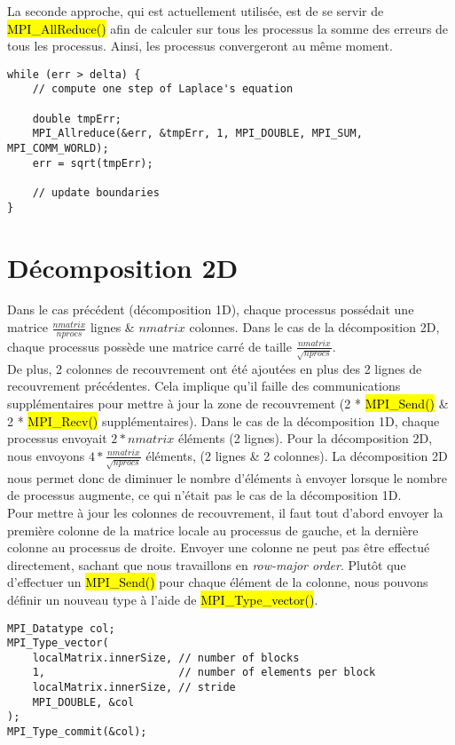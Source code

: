 \documentclass[a4paper,table]{article}
\begin{document}
La seconde approche, qui est actuellement utilisée, est de se servir de
\hl{MPI\_AllReduce()} afin de calculer sur tous les processus la somme des
erreurs de tous les processus. Ainsi, les processus convergeront au même
moment.

\begin{lstlisting}
while (err > delta) {
	// compute one step of Laplace's equation
	
    double tmpErr;
    MPI_Allreduce(&err, &tmpErr, 1, MPI_DOUBLE, MPI_SUM, MPI_COMM_WORLD);
    err = sqrt(tmpErr);
	
	// update boundaries
}
\end{lstlisting}

\section{Décomposition 2D}

Dans le cas précédent (décomposition 1D), chaque processus possédait une matrice
$\frac{nmatrix}{nprocs}$ lignes \& $nmatrix$ colonnes. Dans le cas de la
décomposition 2D, chaque processus possède une matrice carré de taille
$\frac{nmatrix}{\sqrt{nprocs}}$.\\

De plus, 2 colonnes de recouvrement ont été ajoutées en plus des 2 lignes de
recouvrement précédentes. Cela implique qu'il faille des communications
supplémentaires pour mettre à jour la zone de recouvrement (2 * \hl{MPI\_Send()}
\& 2 * \hl{MPI\_Recv()} supplémentaires). Dans le cas de la décomposition 1D,
chaque processus envoyait $2 * nmatrix$ éléments (2 lignes). Pour la
décomposition 2D, nous envoyons $4 * \frac{nmatrix}{\sqrt{nprocs}}$ éléments,
(2 lignes \& 2 colonnes). La décomposition 2D nous permet donc de diminuer le
nombre d'éléments à envoyer lorsque le nombre de processus augmente, ce qui
n'était pas le cas de la décomposition 1D.\\

Pour mettre à jour les colonnes de recouvrement, il faut tout d'abord envoyer
la première colonne de la matrice locale au processus de gauche, et la dernière
colonne au processus de droite. Envoyer une colonne ne peut pas être effectué
directement, sachant que nous travaillons en \emph{row-major order}. Plutôt que
d'effectuer un \hl{MPI\_Send()} pour chaque élément de la colonne, nous pouvons
définir un nouveau type à l'aide de \hl{MPI\_Type\_vector()}.\\
\newpage

\begin{lstlisting}
MPI_Datatype col;
MPI_Type_vector(
    localMatrix.innerSize, // number of blocks
    1,                     // number of elements per block
    localMatrix.innerSize, // stride
    MPI_DOUBLE, &col
);
MPI_Type_commit(&col);
\end{lstlisting}
\
\end{document}
